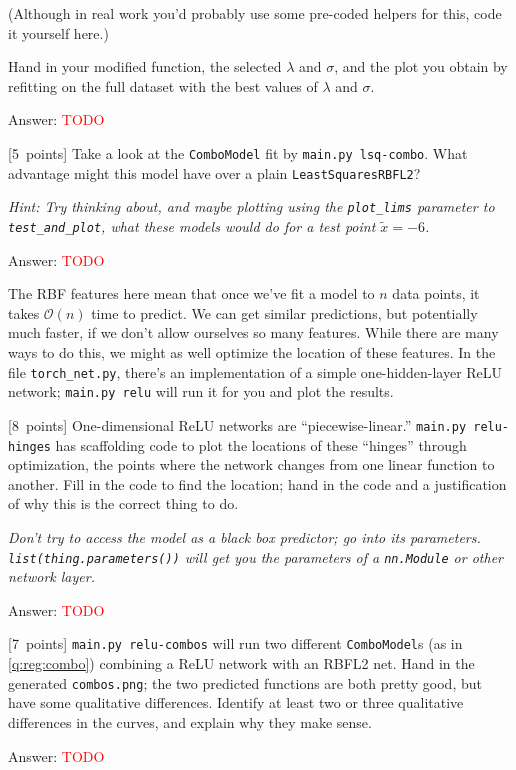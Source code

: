 \documentclass{article}
\newcommand{\ask}[1]{\textcolor{question}{#1}}
\newenvironment{answer}{\par\begingroup\color{answer}Answer: }{\endgroup}
\newcommand{\red}[1]{\textcolor{red}{#1}}
\newcommand{\pts}[1]{\textcolor{points}{[#1~points]}}
\newcommand{\hint}[1]{\textcolor{black!60!white}{\emph{Hint: #1}}}
\newcommand{\meta}[1]{\textcolor{black!60!white}{\emph{#1}}}
\newcommand{\TODO}{\red{TODO}}
\newcommand{\bigO}{\mathcal{O}}
\begin{document}
\begin{qlist}
(Although in real work you'd probably use some pre-coded helpers for this, code it yourself here.)

\ask{Hand in your modified function, the selected $\lambda$ and $\sigma$, and the plot you obtain by refitting on the full dataset with the best values of $\lambda$ and $\sigma$.}

\begin{answer}\TODO\end{answer}


\item \pts{5} \label{q:reg:combo} Take a look at the \texttt{ComboModel} fit by \texttt{main.py lsq-combo}.
\ask{What advantage might this model have over a plain \texttt{LeastSquaresRBFL2}?}

\hint{Try thinking about, and maybe plotting using the \texttt{plot\_lims} parameter to \texttt{test\_and\_plot}, what these models would do for a test point $\tilde x = -6$.}

\begin{answer}\TODO\end{answer}
\end{qlist}

The RBF features here mean that once we've fit a model to $n$ data points,
it takes $\bigO(n)$ time to predict.
We can get similar predictions, but potentially much faster, if we don't allow ourselves so many features.
While there are many ways to do this, we might as well optimize the location of these features.
In the file \texttt{torch\_net.py},
there's an implementation of a simple one-hidden-layer ReLU network;
\texttt{main.py relu} will run it for you and plot the results.

\begin{qlist}[resume]
\item \label{q:first-pytorch} \pts{8}
One-dimensional ReLU networks are ``piecewise-linear.''
\texttt{main.py relu-hinges} has scaffolding code to plot the locations of these ``hinges''
through optimization,
the points where the network changes from one linear function to another.
\ask{Fill in the code to find the location; hand in the code and a justification of why this is the correct thing to do.}

\meta{Don't try to access the model as a black box predictor; go into its parameters. \texttt{list(thing.parameters())} will get you the parameters of a \texttt{nn.Module} or other network layer.}

\begin{answer}\TODO\end{answer}

\item \pts{7}
\texttt{main.py relu-combos} will run two different \texttt{ComboModel}s (as in \cref{q:reg:combo}) combining a ReLU network with an RBFL2 net.
\ask{Hand in the generated \texttt{combos.png}};
the two predicted functions are both pretty good, but have some qualitative differences.
\ask{Identify at least two or three qualitative differences in the curves, and explain why they make sense.}
\begin{answer}\TODO\end{answer}

\end{qlist}
\end{document}
